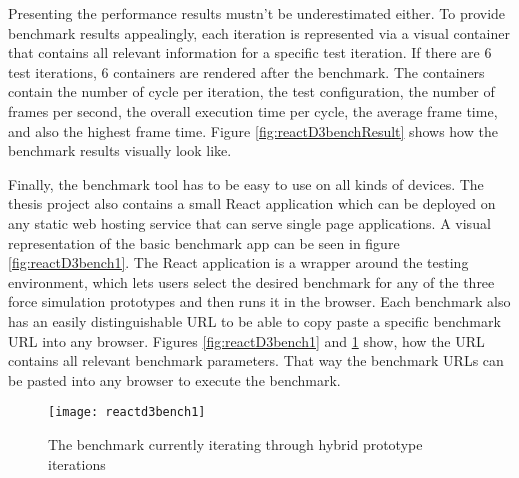 Presenting the performance results mustn't be underestimated either. To provide benchmark results appealingly, each iteration is represented via a visual container that contains all relevant information for a specific test iteration. If there are 6 test iterations, 6 containers are rendered after the benchmark. The containers contain the number of cycle per iteration, the test configuration, the number of frames per second, the overall execution time per cycle, the average frame time, and also the highest frame time. Figure \ref{fig:reactD3benchResult} shows how the benchmark results visually look like.

Finally, the benchmark tool has to be easy to use on all kinds of devices. The thesis project also contains a small React application which can be deployed on any static web hosting service that can serve single page applications. A visual representation of the basic benchmark app can be seen in figure \ref{fig:reactD3bench1}. The React application is a wrapper around the testing environment, which lets users select the desired benchmark for any of the three force simulation prototypes and then runs it in the browser. Each benchmark also has an easily distinguishable URL to be able to copy paste a specific benchmark URL into any browser. Figures \ref{fig:reactD3bench1} and \ref{fig:reactD3bench2} show, how the URL contains all relevant benchmark parameters. That way the benchmark URLs can be pasted into any browser to execute the benchmark. 

\begin{figure}
  \centering
  \texttt{[image: reactd3bench1]}
  \caption{The benchmark currently iterating through hybrid prototype iterations}
  \label{fig:reactD3bench2}
\end{figure}